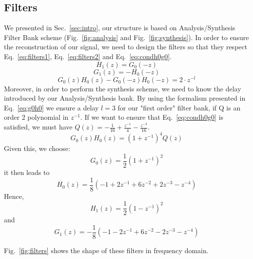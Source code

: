 \documentclass[a4paper,twocolumn]{article}
\begin{document}
\subsection{Filters}
\label{sec:reconstruction}
We presented in Sec.~\ref{sec:intro}, our structure is based on Analysis/Synthesis Filter Bank scheme (Fig.~\ref{fig:analysis} and Fig.~\ref{fig:synthesis}).
In order to ensure the reconstruction of our signal, we need to design the filters so that they respect Eq.~\ref{eq:filters1}, Eq.~\ref{eq:filters2} and Eq.~\ref{eq:condh0g0}.
\begin{equation}
  \label{eq:filters1}
H_1(z)=G_0(-z)
\end{equation}
\begin{equation}
\label{eq:filters2}
G_1(z)=-H_0(-z)		
\end{equation}
\begin{equation}
\label{eq:condh0g0}
G_0(z)H_0(z)-G_0(-z)H_0(-z)=2\cdot z^{-l}		
\end{equation}
 Moreover, in order to perform the synthesis scheme, we need to know the delay introduced by our Analysis/Synthesis bank. By using the formalism presented in Eq.~\ref{eq:g0h0} we ensure a delay $l=3$ for our "first order" filter bank, if Q is an order 2 polynomial in $z^{-1}$. If we want to ensure that Eq.~\ref{eq:condh0g0} is satisfied, we must have $Q(z)=-\frac{1}{16}+\frac{z^{-1}}{4}-\frac{z^{-2}}{16}$.
\begin{equation}
  \label{eq:g0h0}
G_0(z)H_0(z)=(1+z^{-1})^4Q(z)
\end{equation}
Given this, we choose:
\begin{equation}
 G_0(z)=\frac{1}{2}\left(1+z^{-1}\right)^2
\end{equation}
it then leads to 
\begin{equation}
H_0(z)=\frac{1}{8}\left(-1+2z^{-1}+6z^{-2}+2z^{-3}-z^{-4}\right)
\end{equation}
Hence, 
\begin{equation}
H_1(z)=\frac{1}{2}\left(1-z^{-1}\right)^2
\end{equation}
and
\begin{equation}
G_1(z)=-\frac{1}{8}\left(-1-2z^{-1}+6z^{-2}-2z^{-3}-z^{-4} \right)
\end{equation}

Fig.~\ref{fig:filters} shows the shape of these filters in frequency domain.
\end{document}
